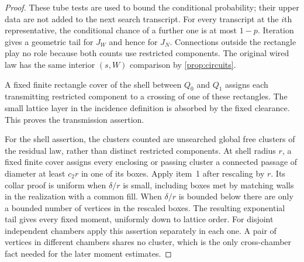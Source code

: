 \begin{proof}
These tube tests are used to bound the conditional probability;
their upper data are not added to the next search transcript.
For every transcript at the $i$th representative,
the conditional chance of a further one is at most $1-p$.
Iteration gives a geometric tail for $J_W$ and hence for $J_N$.
Connections outside the rectangle play no role because both counts
use restricted components. The original wired law has the same
interior $(s,W)$ comparison by \cref{prop:circuits}.

A fixed finite rectangle cover of the shell between $Q_0$ and $Q_1$
assigns each transmitting restricted component to a crossing of one
of these rectangles. The small lattice layer in the incidence
definition is absorbed by the fixed clearance. This proves the
transmission assertion.

For the shell assertion, the clusters counted are unsearched global
free clusters of the residual law, rather than distinct restricted
components. At shell
radius $r$, a fixed finite cover assigns every enclosing or passing
cluster a connected passage of diameter at least $c_2r$ in one
of its boxes. Apply item~1 after rescaling by $r$. Its collar proof
is uniform when $\delta/r$ is small, including boxes met by matching
walls in the realization with a common fill. When $\delta/r$ is bounded
below there are only a bounded number of vertices in the rescaled
boxes. The resulting exponential tail gives every fixed moment,
uniformly down to lattice order. For disjoint independent chambers
apply this assertion separately in each one. A pair of vertices in
different chambers shares no cluster, which is the only
cross-chamber fact needed for the later moment estimates.
\end{proof}

